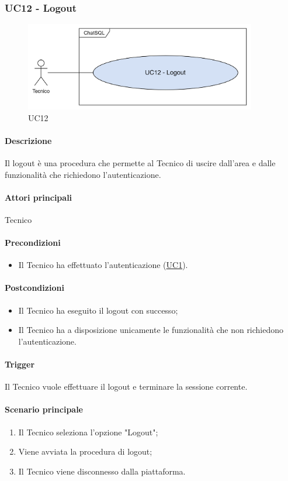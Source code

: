 \subsubsection{UC12 - Logout}\label{UC12}

\begin{figure}[H]
  \centering
  \includegraphics[width=0.90\textwidth]{assets/uc12.png}
  \caption{UC12}
\end{figure}

\paragraph*{Descrizione}
Il logout è una procedura che permette al Tecnico di uscire dall'area e dalle funzionalità che richiedono l'autenticazione.

\paragraph*{Attori principali}
Tecnico

\paragraph*{Precondizioni}
\begin{itemize}
  \item Il Tecnico ha effettuato l'autenticazione (\hyperref[UC1]{UC1}).
\end{itemize}

\paragraph*{Postcondizioni}
\begin{itemize}
  \item Il Tecnico ha eseguito il logout con successo;
  \item Il Tecnico ha a disposizione unicamente le funzionalità che non richiedono l'autenticazione.
\end{itemize}

\paragraph*{Trigger}
Il Tecnico vuole effettuare il logout e terminare la sessione corrente.

\paragraph*{Scenario principale}
\begin{enumerate}
  \item Il Tecnico seleziona l'opzione "Logout";
  \item Viene avviata la procedura di logout;
  \item Il Tecnico viene disconnesso dalla piattaforma.
\end{enumerate}